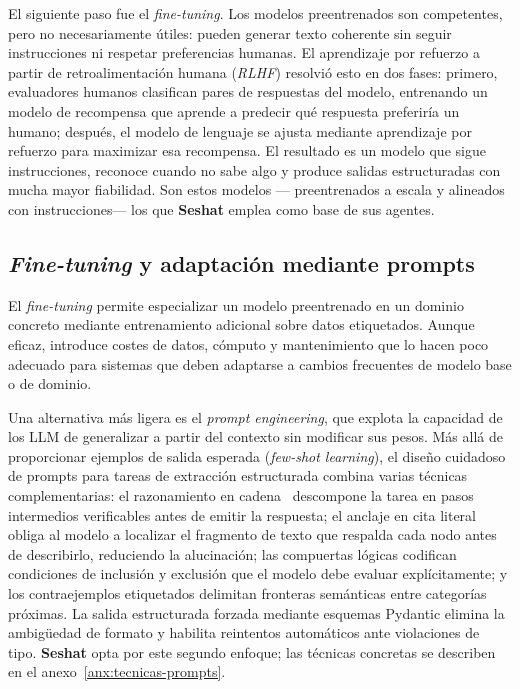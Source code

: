 El siguiente paso fue el \textit{fine-tuning}. Los modelos preentrenados son competentes, pero no
necesariamente útiles: pueden generar texto coherente sin seguir instrucciones ni respetar
preferencias humanas. El aprendizaje por refuerzo a partir de retroalimentación humana
(\textit{RLHF}) resolvió esto en dos fases: primero, evaluadores humanos clasifican pares de
respuestas del modelo, entrenando un modelo de recompensa que aprende a predecir qué respuesta
preferiría un humano; después, el modelo de lenguaje se ajusta mediante aprendizaje por refuerzo
para maximizar esa recompensa. El resultado es un modelo que sigue instrucciones, reconoce cuando
no sabe algo y produce salidas estructuradas con mucha mayor fiabilidad. Son estos modelos —
preentrenados a escala y alineados con instrucciones— los que \textbf{Seshat} emplea como base
de sus agentes.

\subsection{\textit{Fine-tuning} y adaptación mediante prompts}

El \textit{fine-tuning} permite especializar un modelo preentrenado en un dominio concreto
mediante entrenamiento adicional sobre datos etiquetados. Aunque eficaz, introduce costes de
datos, cómputo y mantenimiento que lo hacen poco adecuado para sistemas que deben adaptarse a
cambios frecuentes de modelo base o de dominio.

Una alternativa más ligera es el \textit{prompt engineering}, que explota la capacidad de los
\ac{LLM} de generalizar a partir del contexto sin modificar sus pesos. Más allá de proporcionar
ejemplos de salida esperada (\textit{few-shot learning}), el diseño cuidadoso de prompts para
tareas de extracción estructurada combina varias técnicas complementarias: el razonamiento en
cadena~\cite{wei2022cot} descompone la tarea en pasos intermedios verificables antes de emitir
la respuesta; el anclaje en cita literal obliga al modelo a localizar el fragmento de texto que
respalda cada nodo antes de describirlo, reduciendo la alucinación; las compuertas lógicas
codifican condiciones de inclusión y exclusión que el modelo debe evaluar explícitamente; y los
contraejemplos etiquetados delimitan fronteras semánticas entre categorías próximas. La salida
estructurada forzada mediante esquemas Pydantic elimina la ambigüedad de formato y habilita
reintentos automáticos ante violaciones de tipo. \textbf{Seshat} opta por este segundo enfoque;
las técnicas concretas se describen en el anexo~\ref{anx:tecnicas-prompts}.

